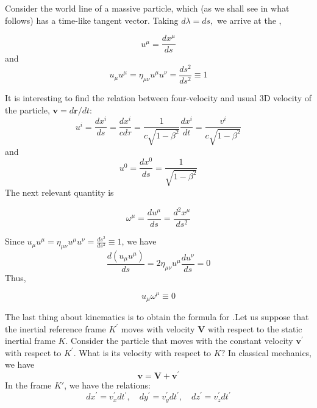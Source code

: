 Consider the world line of a massive particle, which (as we shall see in what follows) has a time-like tangent vector. Taking $d \lambda=d s,$ we arrive at the ,
\begin{qt}
    \begin{equation}
u^{\mu}=\frac{d x^{\mu}}{d s}
\end{equation}
and
\begin{equation}
u_{\mu} u^{\mu}=\eta_{\mu \nu} u^{\mu} u^{\nu}=\frac{d s^{2}}{d s^{2}} \equiv 1
\end{equation}
\end{qt}
It is interesting to find the relation between four-velocity and usual 3D velocity of
the particle, $\mathbf{v}=d\mathbf{r}/dt$:
\begin{equation}
u^{i}=\frac{d x^{i}}{d s}=\frac{d x^{i}}{c d \tau}=\frac{1}{c \sqrt{1-\beta^{2}}} \frac{d x^{i}}{d t}=\frac{v^{i}}{c \sqrt{1-\beta^{2}}}
\label{relativistic-ui}
\end{equation}
and 
\begin{equation}
u^{0}=\frac{d x^{0}}{d s}=\frac{1}{\sqrt{1-\beta^{2}}}
\label{relativistic-u0}
\end{equation}
The next relevant quantity is 
\begin{qt}
    \begin{equation}
\omega^{\mu}=\frac{d u^{\mu}}{d s}=\frac{d^{2} x^{\mu}}{d s^{2}}
\end{equation}
\end{qt}
Since $u_{\mu} u^{\mu}=\eta_{\mu \nu} u^{\mu} u^{\nu}=\frac{d s^{2}}{d s^{2}} \equiv 1$, we have
$$
\frac{d(u_{\mu} u^{\mu})}{ds}=2\eta_{\mu\nu}u^{\mu}\frac{du^{\nu}}{ds}=0
$$
Thus,
\begin{qt}
    \begin{equation}
u_{\mu} \omega^{\mu} \equiv 0
\end{equation}
\end{qt}
The last thing about kinematics is to obtain the formula for \textbf{}.Let us suppose that the inertial reference frame $K^{\prime}$ moves with velocity $\mathbf{V}$ with respect to the static inertial frame $K .$ Consider the particle that moves with the constant velocity $\mathbf{v}^{\prime}$ with respect to $K^{\prime} .$ What is its velocity with respect to $K ?$ In classical mechanics, we have
$$
\mathbf{v}=\mathbf{V}+\mathbf{v}^{\prime}
$$
In the frame $K'$, we have the relations:
\begin{equation}
    d x^{\prime}=v_{x}^{\prime} d t^{\prime}, \quad d y^{\prime}=v_{y}^{\prime} d t^{\prime}, \quad d z^{\prime}=v_{z}^{\prime} d t^{\prime}
    \label{k-k'}
\end{equation}
